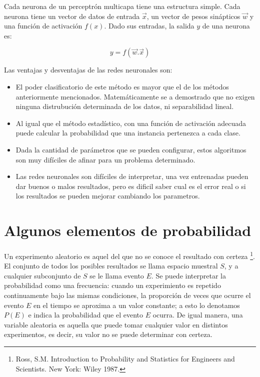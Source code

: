 \documentclass[a4paper, 11pt, oneside]{report}
\begin{document}
Cada neurona de un perceptrón multicapa tiene una estructura simple. Cada neurona tiene un vector de datos de entrada $\vec{x}$, un vector de pesos sinápticos $\vec{w}$ y una función de activación $f(x)$. Dado sus entradas, la salida $y$ de una neurona es:

\[y = f(\vec{w}.\vec{x})\]

Las ventajas y desventajas de las redes neuronales son:

\begin{itemize}
	\item El poder clasificatorio de este método es mayor que el de los métodos anteriormente mencionados. Matemáticamente se a demostrado que no exigen ninguna distrubución determinada de los datos, ni separabilidad lineal.
	\item Al igual que el método estadístico, con una función de activación adecuada puede calcular la probabilidad que una instancia pertenezca a cada clase.
	\item Dada la cantidad de parámetros que se pueden configurar, estos algoritmos son muy difíciles de afinar para un problema determinado.
	\item Las redes neuronales son difíciles de interpretar, una vez entrenadas pueden dar buenos o malos resultados, pero es dificil saber cual es el error real o si los resultados se pueden mejorar cambiando los parametros.
\end{itemize}

\section{Algunos elementos de probabilidad}

Un experimento aleatorio es aquel del que no se conoce el resultado con certeza \footnote{Ross, S.M. Introduction to Probability and Statistics for Engineers and Scientists. New York: Wiley 1987.}. El conjunto de todos los posibles resultados se llama espacio muestral $S$, y a cualquier subconjunto de $S$ se le llama evento $E$. Se puede interpretar la probabilidad como una frecuencia: cuando un experimiento es repetido continuamente bajo las mismas condiciones, la proporción de veces que ocurre el evento $E$ en el tiempo se aproxima a un valor constante; a esto lo denotamos $P(E)$ e indica la probabilidad que el evento $E$ ocurra. De igual manera, una variable aleatoria es aquella que puede tomar cualquier valor en distintos experimentos, es decir, su valor no se puede determinar con certeza.
\end{document}
